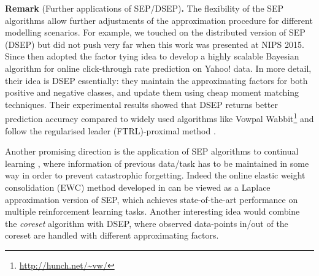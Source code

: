 \vspace{1em}
\begin{tcolorbox}
\textbf{Remark} (Further applications of SEP/DSEP)\textbf{.}
The flexibility of the SEP algorithms allow further adjustments of the approximation procedure for different modelling scenarios. For example, we touched on the distributed version of SEP (DSEP) but did not push very far when this work was presented at NIPS 2015. Since then \cite{zhe:yahoo2016} adopted the factor tying idea to develop a highly scalable Bayesian algorithm for online click-through rate prediction on Yahoo! data. In more detail, their idea is DSEP essentially: they maintain the approximating factors for both positive and negative classes, and update them using cheap moment matching techniques. Their experimental results showed that DSEP returns better prediction accuracy compared to widely used algorithms like Vowpal Wabbit\footnote{\url{http://hunch.net/~vw/}} and follow the regularised leader (FTRL)-proximal method \citep{mcmahan:ftrl_proximal2013}.

Another promising direction is the application of SEP algorithms to continual learning \citep{ring:thesis1994, ring:child1997, kirkpatrick:ewc2017}, where information of previous data/task has to be maintained in some way in order to prevent catastrophic forgetting. Indeed the online elastic weight consolidation (EWC) method developed in \cite{schwarz:pc2018} can be viewed as a Laplace approximation version of SEP, which achieves state-of-the-art performance on multiple reinforcement learning tasks.
%
Another interesting idea would combine the \emph{coreset} algorithm with DSEP, where observed data-points in/out of the coreset are handled with different approximating factors.
\end{tcolorbox}